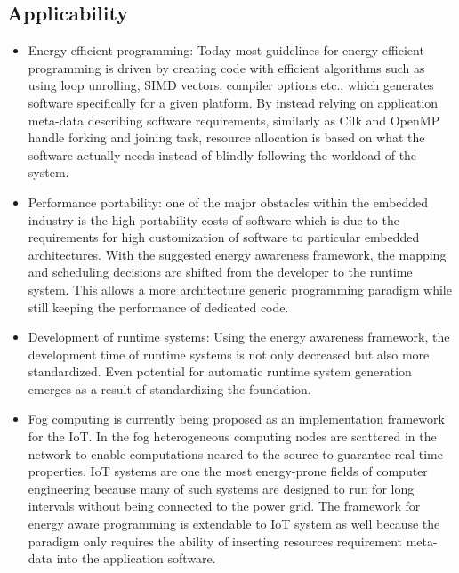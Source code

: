 \documentclass{article}
\begin{document}
\subsection{Applicability}
\begin{itemize}
 \item Energy efficient programming: Today most guidelines for energy efficient programming is driven by creating code with efficient algorithms such as using loop unrolling, SIMD vectors, compiler options etc., which generates software specifically for a given platform. 
 By instead relying on application meta-data describing software requirements, similarly as Cilk and OpenMP handle forking and joining task, resource allocation is based on what the software actually needs instead of blindly following the workload of the system.
 \item Performance portability: one of the major obstacles within the embedded industry is the high portability costs of software which is due to the requirements for high customization of software to particular embedded architectures. 
 With the suggested energy awareness framework, the mapping and scheduling decisions are shifted from the developer to the runtime system. 
 This allows a more architecture generic programming paradigm while still keeping the performance of dedicated code.
 \item Development of runtime systems: Using the energy awareness framework, the development time of runtime systems is not only decreased but also more standardized. 
 Even potential for automatic runtime system generation emerges as a result of standardizing the foundation.
 \item Fog computing is currently being proposed as an implementation framework for the IoT. 
 In the fog heterogeneous computing nodes are scattered in the network to enable computations neared to the source to guarantee real-time properties. 
 IoT systems are one the most energy-prone fields of computer engineering because many of such systems are designed to run for long intervals without being connected to the power grid. 
 The framework for energy aware programming is extendable to IoT system as well because the paradigm only requires the ability of inserting resources requirement meta-data into the application software. 
\end{itemize}
\end{document}
